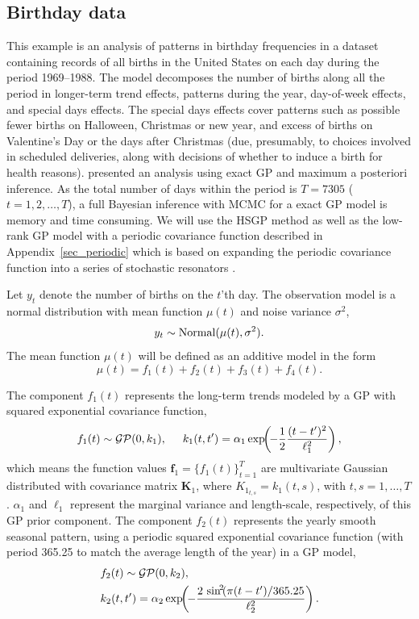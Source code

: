 \subsection{Birthday data}\label{sec_birthday}
%
This example is an analysis of patterns in birthday frequencies in a dataset containing records of all births in the United States on each day during the period 1969–1988. The model decomposes the number of births along all the period in longer-term trend effects, patterns during the year, day-of-week effects, and special days effects. The special days effects cover patterns such as possible fewer births on Halloween, Christmas or new year, and excess of births on Valentine’s Day or the days after Christmas (due, presumably, to choices involved in scheduled deliveries, along with decisions of whether to induce a birth for health reasons). \citet{gelman2013bayesian} presented an analysis using exact GP and maximum a posteriori inference. As the total number of days within the period is $T=7305$ ($t=1,2,\dots,T$), a full Bayesian inference with MCMC for a exact GP model is memory and time consuming. We will use the HSGP method as well as the low-rank GP model with a periodic covariance function described in Appendix~\ref{sec_periodic} which is based on expanding the periodic covariance function into a series of stochastic resonators \citep{solin2014explicit}.

Let $y_t$ denote the number of births on the $t$'th day. The observation model is a normal distribution with mean function $\mu(t)$ and noise variance $\sigma^2$,
%
\begin{equation*}
y_{t} \sim \operatorname{Normal}(\mu(t),\sigma^2).
\end{equation*}
%
The mean function $\mu(t)$ will be defined as an additive model in the form
%
\begin{equation} \label{eq_mean_brithday}
\mu(t) = f_1(t) + f_2(t) + f_3(t) + f_4(t).
\end{equation}

The component $f_1(t)$ represents the long-term trends modeled by a GP with squared exponential covariance function,
%
\begin{equation*}
f_1(t) \sim \operatorname{\mathcal{GP}}(0,k_1), \hspace{5mm} k_1(t,t') = \alpha_1 \exp\!\!\left(\!-\frac{1}{2} \frac{(t-t')^2}{\ell_1^2}\right), 
\end{equation*}
%
which means the function values $\bm{f}_1=\{f_1(t)\}_{t=1}^T$ are multivariate Gaussian distributed with covariance matrix $\bm{K}_1$, where $K_{1_{t,s}}=k_1(t,s)$, with $t,s=1,\dots,T$. $\alpha_1$ and $\ell_1$ represent the marginal variance and length-scale, respectively, of this GP prior component. 
The component $f_2(t)$ represents the yearly smooth seasonal pattern, using a periodic squared exponential covariance function (with period 365.25 to match the average length of the year) in a GP model,
%
\begin{align*}
&f_2(t) \sim \operatorname{\mathcal{GP}}(0,k_2), \\
&k_2(t,t') = \alpha_2 \exp\!\!\left(\!-\frac{2\,\sin^{\!2}\!(\pi(t-t')/365.25}{\ell_2^2}\right).
\end{align*}


